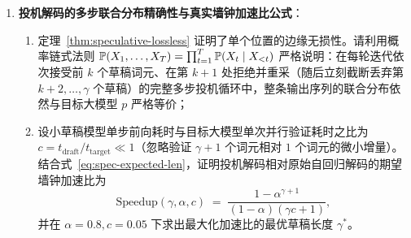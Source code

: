 \begin{enumerate}
  \item[\textbf{6.6.4}] \textbf{投机解码的多步联合分布精确性与真实墙钟加速比公式}：
  \begin{enumerate}
    \item 定理~\ref{thm:speculative-lossless} 证明了单个位置的边缘无损性。请利用概率链式法则 $\mathbb{P}(X_1, \dots, X_T) = \prod_{t=1}^T \mathbb{P}(X_t \mid X_{<t})$ 严格说明：在每轮迭代依次接受前 $k$ 个草稿词元、在第 $k+1$ 处拒绝并重采（随后立刻截断丢弃第 $k+2, \dots, \gamma$ 个草稿）的完整多步投机循环中，整条输出序列的联合分布依然与目标大模型 $p$ 严格等价；
    \item 设小草稿模型单步前向耗时与目标大模型单次并行验证耗时之比为 $c = t_{\mathrm{draft}} / t_{\mathrm{target}} \ll 1$（忽略验证 $\gamma+1$ 个词元相对 $1$ 个词元的微小增量）。结合式~\eqref{eq:spec-expected-len}，证明投机解码相对原始自回归解码的期望墙钟加速比为
    \[
      \mathrm{Speedup}(\gamma, \alpha, c) \;=\; \frac{1 - \alpha^{\gamma + 1}}{(1 - \alpha)(\gamma c + 1)},
    \]
    并在 $\alpha = 0.8, c = 0.05$ 下求出最大化加速比的最优草稿长度 $\gamma^*$。
  \end{enumerate}
\end{enumerate}


